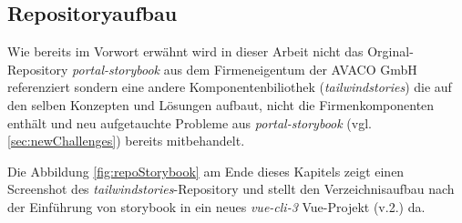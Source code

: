 \subsection{Repositoryaufbau}
Wie bereits im Vorwort erwähnt wird in dieser Arbeit nicht das Orginal-Repository \textit{portal-storybook} aus dem Firmeneigentum der AVACO GmbH referenziert sondern eine andere Komponentenbiliothek (\textit{tailwindstories}) die auf den selben Konzepten und Lösungen aufbaut, nicht die Firmenkomponenten enthält und neu aufgetauchte Probleme aus \textit{portal-storybook} (vgl. \ref{sec:newChallenges}) bereits mitbehandelt.

Die Abbildung \ref{fig:repoStorybook} am Ende dieses Kapitels zeigt einen Screenshot des \textit{tailwindstories}-Repository und stellt den Verzeichnisaufbau nach der Einführung von storybook in ein neues \textit{vue-cli-3} Vue-Projekt (v.2.) da.


